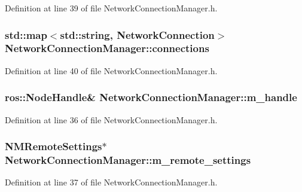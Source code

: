 \-Definition at line 39 of file \-Network\-Connection\-Manager.\-h.

\subsubsection[{connections}]{\setlength{\rightskip}{0pt plus 5cm}std\-::map$<$std\-::string, \-Network\-Connection$>$ {\bf \-Network\-Connection\-Manager\-::connections}\hspace{0.3cm}{\ttfamily  [private]}}\label{classNetworkConnectionManager_ab75d5285bcba0b2e0043307e9b87474f}


\-Definition at line 40 of file \-Network\-Connection\-Manager.\-h.

\subsubsection[{m\-\_\-handle}]{\setlength{\rightskip}{0pt plus 5cm}ros\-::\-Node\-Handle\& {\bf \-Network\-Connection\-Manager\-::m\-\_\-handle}\hspace{0.3cm}{\ttfamily  [private]}}\label{classNetworkConnectionManager_a2e35829f6d0b115042694cf905245c2a}


\-Definition at line 36 of file \-Network\-Connection\-Manager.\-h.

\subsubsection[{m\-\_\-remote\-\_\-settings}]{\setlength{\rightskip}{0pt plus 5cm}\-N\-M\-Remote\-Settings$\ast$ {\bf \-Network\-Connection\-Manager\-::m\-\_\-remote\-\_\-settings}\hspace{0.3cm}{\ttfamily  [private]}}\label{classNetworkConnectionManager_ac76e26931f1389722b68ddca91c0e574}


\-Definition at line 37 of file \-Network\-Connection\-Manager.\-h.

